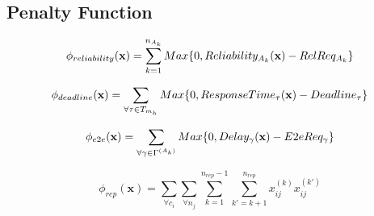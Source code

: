 \subsection{Penalty Function}
\label{sec:penaltyfunction}

\begin{equation}
\label{}
    \phi_{reliability}(\textbf{x}) = \sum_{k=1}^{n_{A_k}}{Max \{0, Reliability_{A_k}(\textbf{x}) - RelReq_{A_k} \}}
\end{equation}

\begin{equation}
\label{}
    \phi_{deadline}(\textbf{x}) = \sum_{\forall \tau\in T_{m_h}}{Max \{0, ResponseTime_{\tau}(\textbf{x}) - Deadline_{\tau} \}}
\end{equation}

\begin{equation}
\label{}
    \phi_{e2e}(\textbf{x}) = \sum_{\forall \gamma \in \ssp{\Gamma}}{Max \{0, Delay_\gamma(\x) - E2eReq_\gamma \}}
\end{equation}

\begin{equation}
\label{}
    \phi_{rep}(\textbf{x}) = \sum_{\forall c_i}{\sum_{\forall n_j}{\sum_{k=1}^{n_{rep}-1}{\sum_{k'=k+1}^{n_{rep}} x_{ij}^{(k)} x_{ij}^{(k')}}}}
\end{equation}



